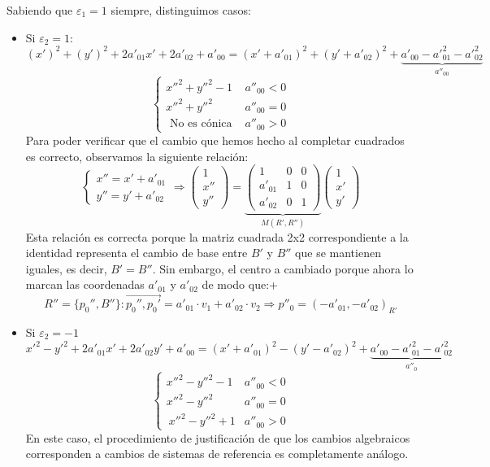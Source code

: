 \documentclass[10pt,a4paper,openright]{book}
\begin{document}
Sabiendo que $\varepsilon_1 = 1$ siempre, distinguimos casos:
\begin{itemize}
\item Si $\varepsilon_2 = 1$:
$$(x')^2 + (y')^2 + 2 a'_{01} x' + 2  a'_{02} + a'_{00}= (x' + a'_{01} )^2 + (y' + a'_{02})^2 + \underbrace{a'_{00} - a'^2_{01} - a'^2_{02}}_{a''_{00}}$$
$$\begin{cases} x''^2 + y''^2 - 1 & a''_{00} < 0 \\ x''^2 + y''^2 & a''_{00} = 0 \\ \mbox{ No es cónica } & a''_{00} > 0 \end{cases}$$
Para poder verificar que el cambio que hemos hecho al completar cuadrados es correcto, observamos la siguiente relación:
$$\begin{cases}
x'' = x' + a'_{01} \\ y'' = y'  + a'_{02}
\end{cases} \Rightarrow \begin{pmatrix}
1 \\ x'' \\ y''
\end{pmatrix} =
\underbrace{\left(\begin{array}{c|cc}
1 & 0 & 0 \\
\hline
a'_{01} & 1  & 0  \\
a'_{02} &  0 &1 
\end{array}
\right)}_{M(R',R'')}
\begin{pmatrix}
1 \\ x' \\ y'
\end{pmatrix}$$
Esta relación es correcta porque la matriz cuadrada 2x2 correspondiente a la identidad representa el cambio de base entre $B'$ y $B''$ que se mantienen iguales, es decir, $B' = B''$. Sin embargo, el centro a cambiado porque ahora lo marcan las coordenadas $a'_{01}$ y $a'_{02}$ de modo que:+
$$R''=\{p_0'', B''\} : \vec{p_0'',p_0'} = a'_{01} \cdot v_1 + a'_{02} \cdot v_2 \Rightarrow p''_0 = (-a'_{01}, -a'_{02})_{R'}$$

\item Si $\varepsilon_2 = -1$
$$x'^2 - y'^2 + 2 a'_{01} x' + 2  a'_{02}y' + a'_{00} = (x' + a'_{01} )^2 - (y' - a'_{02})^2 + \underbrace{a'_{00} - a'^2_{01} - a'^2_{02}}_{a''_0} $$
$$\begin{cases} x''^2 - y''^2 - 1 & a''_{00} < 0 \\ x''^2 - y''^2 & a''_{00} = 0 \\ \ x''^2 - y''^2 + 1 & a''_{00} > 0 \end{cases}$$
En este caso, el procedimiento de justificación de que los cambios algebraicos corresponden a cambios de sistemas de referencia es completamente análogo.


\end{itemize}
\end{document}
